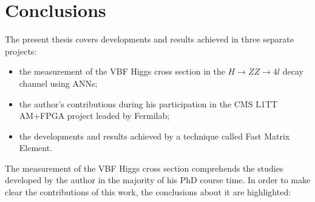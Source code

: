 \chapter{Conclusions}
The present thesis covers developments and results achieved in three separate projects:
\begin{itemize}
	\item the measurement of the VBF Higgs cross section in the $H \rightarrow ZZ \rightarrow 4l$ decay channel using ANNs;
	\item the author's contributions during his participation in the CMS L1TT AM+FPGA project leaded by Fermilab;
	\item the developments and results achieved by a technique called Fast Matrix Element.
\end{itemize}

The measurement of the VBF Higgs cross section comprehends the studies developed by the author in the majority of his PhD course time. In order to make clear the contributions of this work, the conclusions about it are highlighted:
